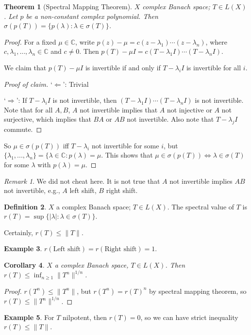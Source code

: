 \documentclass{article}
\theoremstyle{definition}
\newtheorem{defn}{Definition}[section]
\newtheorem{example}[defn]{Example}
\theoremstyle{remark}
\newtheorem{rem}{Remark}
\theoremstyle{plain}
\newtheorem{thm}[defn]{Theorem}
\newtheorem{crly}[defn]{Corollary}
\newcommand{\CC}{\mathbb{C}}
\begin{document}
\begin{thm}[Spectral Mapping Theorem]
    $X$ complex Banach space; $T\in L(X)$. Let $p$ be a non-constant complex polynomial. Then $\sigma(p(T))=\{p(\lambda):\lambda\in\sigma(T)\}$.
\end{thm}
\begin{proof}
    For a fixed $\mu\in \CC$, write $p(z)-\mu=c(z-\lambda_1)\cdots(z-\lambda_n)$, where $c,\lambda_1,...,\lambda_n\in \CC$ and $c\neq 0$. Then $p(T)-\mu I=c(T-\lambda_1I)\cdots(T-\lambda_nI)$.

    We claim that $p(T)-\mu I$ is invertible if and only if $T-\lambda_iI$ is invertible for all $i$.
    \begin{proof}[Proof of claim]
        `$\Leftarrow$': Trivial

        `$\Rightarrow$': If $T-\lambda_iI$ is not invertible, then $(T-\lambda_1I)\cdots(T-\lambda_nI)$ is not invertible. Note that for all $A,B$, $A$ not invertible implies that $A$ not injective or $A$ not surjective, which implies that $BA$ or $AB$ not invertible. Also note that $T-\lambda_j I$ commute.
    \end{proof}
    So $\mu\in\sigma(p(T))$ iff $T-\lambda_i$ not invertible for some $i$, but $\{\lambda_1,...,\lambda_n\}=\{\lambda\in\CC:p(\lambda)=\mu$. This shows that $\mu\in\sigma(p(T))\Leftrightarrow \lambda\in\sigma(T)$ for some $\lambda$ with $p(\lambda)=\mu$.
\end{proof}
\begin{rem}
    We did not cheat here. It is not true that $A$ not invertible implies $AB$ not invertible, e.g., $A$ left shift, $B$ right shift.
\end{rem}
\begin{defn}
    $X$ a complex Banach space; $T\in L(X)$. The spectral value of $T$ is $r(T)=\sup\{|\lambda|:\lambda\in\sigma(T)\}$.
\end{defn}
Certainly, $r(T)\le \|T\|$.
\begin{example}
    $r(\text{Left shift})=r(\text{Right shift})=1$.
\end{example}
\begin{crly}
    $X$ a complex Banach space, $T\in L(X)$. Then $r(T)\le \inf_{n\ge 1}\|T^n\|^{1/n}$.
\end{crly}
\begin{proof}
    $r(T^n)\le \|T^n\|$, but $r(T^n)=r(T)^n$ by spectral mapping theorem, so $r(T)\le \|T^n\|^{1/n}$.
\end{proof}
\begin{example}
    For $T$ nilpotent, then $r(T)=0$, so we can have strict inequality $r(T)\le \|T\|$.
\end{example}
\end{document}
